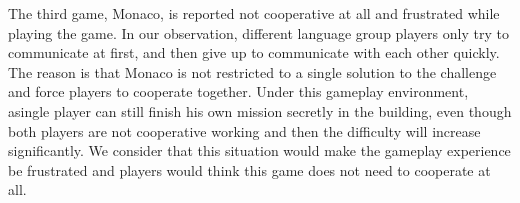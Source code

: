 The third game, Monaco, is reported not cooperative at all and frustrated while playing the game. In our observation, different language group players only try to communicate at first, and then give up to communicate with each other quickly. The reason is that Monaco is not restricted to a single solution to the challenge and force players to cooperate together. Under this gameplay environment, asingle player can still finish his own mission secretly in the building, even though both players are not cooperative working and then the difficulty will increase significantly. We consider that this situation would make the gameplay experience be frustrated and players would think this game does not need to cooperate at all.




